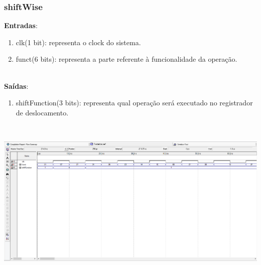 \documentclass{article}
\begin{document}
    \subsubsection{shiftWise}
    \textbf{Entradas}:
   \begin{enumerate}
        \item clk(1 bit): representa o clock do sistema.
        \item funct(6 bits): representa a parte referente à funcionalidade da operação.\\
    \end{enumerate}
    \\
    \textbf{Saídas}:
    \begin{enumerate}
        \item shiftFunction(3 bits): representa qual operação será executado no registrador de deslocamento.\\
    \end{enumerate}\\
    \begin{center}
        \includegraphics[scale=0.4]{shiftWise.PNG}
    \end{center}
    
    \newpage
\end{document}
